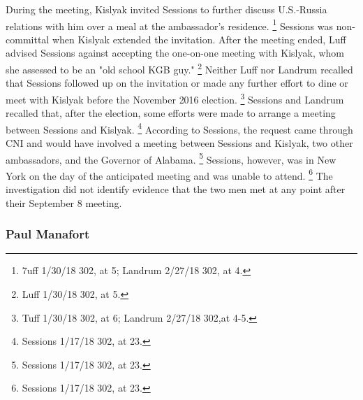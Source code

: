 During the meeting, Kislyak invited Sessions to further discuss U.S.-Russia relations with him over a meal at the ambassador's residence.%
\footnote{7uff 1/30/18 302, at 5;
Landrum 2/27/18 302, at 4.}
Sessions was non-committal when Kislyak extended the invitation.
After the meeting ended, Luff advised Sessions against accepting the one-on-one meeting with Kislyak, whom she assessed to be an "old school KGB guy."%
\footnote{Luff 1/30/18 302, at 5.}
Neither Luff nor Landrum recalled that Sessions followed up on the invitation or made any further effort to dine or meet with Kislyak before the November 2016 election.%
\footnote{Tuff 1/30/18 302, at 6;
Landrum 2/27/18 302,at 4-5.}
Sessions and Landrum recalled that, after the election, some efforts were made to arrange a meeting between Sessions and Kislyak.%
\footnote{Sessions 1/17/18 302, at 23.}
According to Sessions, the request came through CNI and would have involved a meeting between Sessions and Kislyak, two other ambassadors, and the Governor of Alabama.%
\footnote{Sessions 1/17/18 302, at 23.}
Sessions, however, was in New York on the day of the anticipated meeting and was unable to attend.%
\footnote{Sessions 1/17/18 302, at 23.}
The investigation did not identify evidence that the two men met at any point after their September 8 meeting.

\subsubsection{Paul Manafort}

